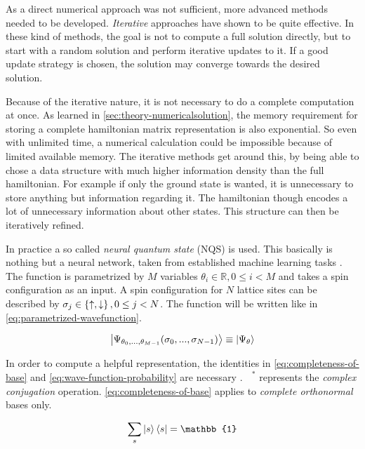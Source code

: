 As a direct numerical approach was not sufficient, more advanced methods needed to be developed. 
\emph{Iterative} approaches have shown to be quite effective. 
In these kind of methods, the goal is not to compute a full solution directly, but to start with a random solution and perform iterative updates to it. 
If a good update strategy is chosen, the solution may converge towards the desired solution.

Because of the iterative nature, it is not necessary to do a complete computation at once. 
As learned in \autoref{sec:theory-numericalsolution}, the memory requirement for storing a complete hamiltonian matrix representation is also exponential.
So even with unlimited time, a numerical calculation could be impossible because of limited available memory. 
The iterative methods get around this, by being able to chose a data structure with much higher information density than the full hamiltonian. For example if only the ground state is wanted, it is unnecessary to store anything but information regarding it. The hamiltonian though encodes a lot of \glqq unnecessary\grqq{} information about other states. This structure can then be iteratively refined.

In practice a so called \emph{neural quantum state} (NQS) is used. 
This basically is nothing but a neural network, taken from established machine learning tasks \cite{restrictedBoltzmanMachines}.
The function is parametrized by $M$ variables $\theta_i \in \mathbb{R}, 0\leq i < M$ and takes a spin configuration as an input.
A spin configuration for $N$ lattice sites can be described by $\sigma_j \in \left\{\uparrow, \downarrow\right\}, 0\leq j < N$.
The function will be written like in \autoref{eq:parametrized-wavefunction}.

\begin{equation}
    \label{eq:parametrized-wavefunction}
    \ket{\Psi_{\theta_0, ..., \theta_{M-1}}(\sigma_0, ..., \sigma_{N-1})} \equiv \ket{\Psi_\theta}
\end{equation}

In order to compute a helpful representation, the identities in \autoref{eq:completeness-of-base} and \autoref{eq:wave-function-probability} are necessary \cite{schwablQM}. \hspace{-0.13cm}$\phantom{\Psi}^\ast$ represents the \emph{complex conjugation} operation. \autoref{eq:completeness-of-base} applies to \emph{complete orthonormal} bases only.

\begin{equation}
    \label{eq:completeness-of-base}
    \sum\limits_{s} \ket{s}\bra{s} = \mathbb{1}
\end{equation}

